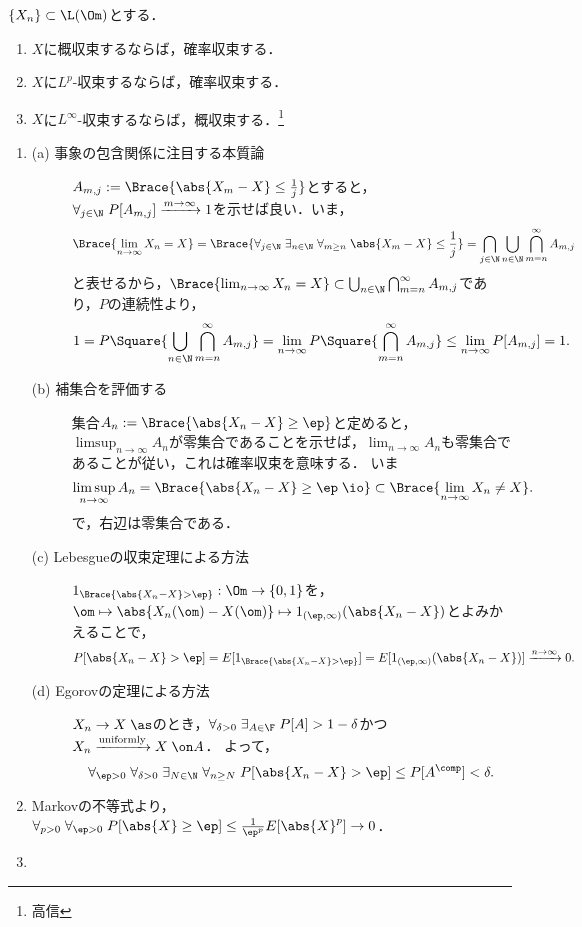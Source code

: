 \documentclass[uplatex,dvipdfmx]{jsreport}
\begin{document}
\begin{proposition}
    $\{X_n\}\subset\L(\Om)$とする．
    \begin{enumerate}
        \item $X$に概収束するならば，確率収束する．
        \item $X$に$L^p$-収束するならば，確率収束する．
        \item $X$に$L^\infty$-収束するならば，概収束する．\footnote{高信\cite{高信敏}}
    \end{enumerate}
\end{proposition}
\begin{Proof}\mbox{}
    \begin{enumerate}
        \item 
        \begin{description}
            \item[(a) 事象の包含関係に注目する本質論] $A_{m,j}:=\Brace{\abs{X_m-X}\le\frac{1}{j}}$とすると，$\forall_{j\in\N}\;P[A_{m,j}]\xrightarrow{m\to\infty}1$を示せば良い．いま，
            \[\Brace{\lim_{n\to\infty}X_n=X}=\Brace{\forall_{j\in\N}\;\exists_{n\in\N}\;\forall_{m\ge n}\;\abs{X_m-X}\le\frac{1}{j}}=\bigcap_{j\in\N}\bigcup_{n\in\N}\bigcap_{m=n}^\infty A_{m,j}\]
            と表せるから，$\Brace{\lim_{n\to\infty}X_n=X}\subset\bigcup_{n\in\N}\bigcap_{m=n}^\infty A_{m,j}$であり，$P$の連続性より，
            \[1=P\Square{\bigcup_{n\in\N}\bigcap_{m=n}^\infty A_{m,j}}=\lim_{n\to\infty}P\Square{\bigcap_{m=n}^\infty A_{m,j}}\le\lim_{n\to\infty}P[A_{m,j}]=1.\]
            \item[(b) 補集合を評価する] 集合$A_n:=\Brace{\abs{X_n-X}\ge\ep}$と定めると，$\limsup_{n\to\infty}A_n$が零集合であることを示せば，$\lim_{n\to\infty}A_n$も零集合であることが従い，これは確率収束を意味する．
            いま
            \[\limsup_{n\to\infty}A_n=\Brace{\abs{X_n-X}\ge\ep\;\io}\subset\Brace{\lim_{n\to\infty}X_n\ne X}.\]
            で，右辺は零集合である．
            \item[(c) Lebesgueの収束定理による方法] $1_{\Brace{\abs{X_n-X}>\ep}}:\Om\to\{0,1\}$を，$\om\mapsto\abs{X_n(\om)-X(\om)}\mapsto 1_{(\ep,\infty)}(\abs{X_n-X})$とよみかえることで，
            \[P[\abs{X_n-X}>\ep]=E[1_{\Brace{\abs{X_n-X}>\ep}}]=E[1_{(\ep,\infty)}(\abs{X_n-X})]\xrightarrow{n\to\infty}0.\]
            \item[(d) Egorovの定理による方法]
            $X_n\to X\;\as$のとき，$\forall_{\delta>0}\;\exists_{A\in\F}\;P[A]>1-\delta$かつ$X_n\xrightarrow{\text{uniformly}} X\;\on A$．
            よって，
            \[\forall_{\ep>0}\;\forall_{\delta>0}\;\exists_{N\in\N}\;\forall_{n\ge N}\;P[\abs{X_n-X}>\ep]\le P[A^\comp]<\delta.\]
        \end{description}
        \item Markovの不等式より，$\forall_{p>0}\;\forall_{\ep>0}\;P[\abs{X}\ge\ep]\le\frac{1}{\ep^p}E[\abs{X}^p]\to0$．
        \item 
    \end{enumerate}
\end{Proof}
\end{document}
